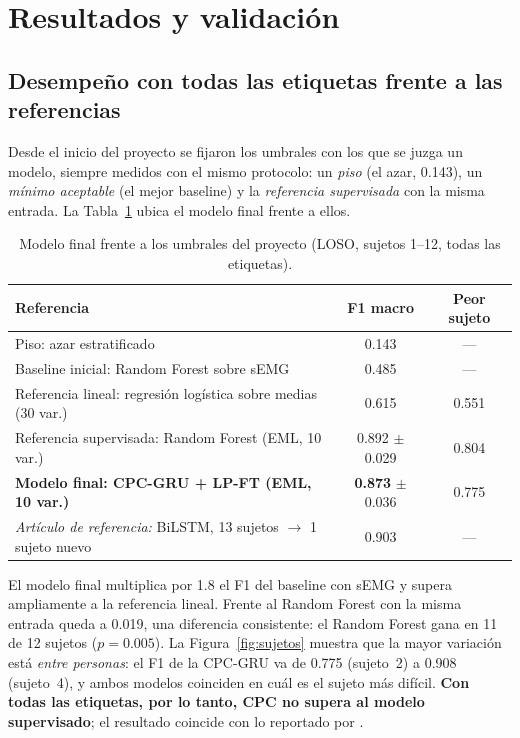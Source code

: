 \documentclass[letterpaper,11pt]{article}
\begin{document}
\section{Resultados y validación}

\subsection{Desempeño con todas las etiquetas frente a las referencias}
Desde el inicio del proyecto se fijaron los umbrales con los que se juzga un modelo, siempre medidos con el mismo protocolo: un \emph{piso} (el azar, 0.143), un \emph{mínimo aceptable} (el mejor baseline) y la \emph{referencia supervisada} con la misma entrada. La Tabla~\ref{tab:final} ubica el modelo final frente a ellos.

\begin{table}[H]
  \centering
  \small
  \caption{Modelo final frente a los umbrales del proyecto (LOSO, sujetos 1--12, todas las etiquetas).}
  \label{tab:final}
  \begin{tabular}{p{9.6cm}cc}
    \toprule
    Referencia & F1 macro & Peor sujeto \\
    \midrule
    Piso: azar estratificado                                  & 0.143 & --- \\
    Baseline inicial: Random Forest sobre sEMG                & 0.485 & --- \\
    Referencia lineal: regresión logística sobre medias (30 var.) & 0.615 & 0.551 \\
    Referencia supervisada: Random Forest (EML, 10 var.)      & 0.892 $\pm$ 0.029 & 0.804 \\
    \textbf{Modelo final: CPC-GRU + LP-FT (EML, 10 var.)}     & \textbf{0.873} $\pm$ 0.036 & 0.775 \\
    \midrule
    \emph{Artículo de referencia:} BiLSTM, 13 sujetos $\to$ 1 sujeto nuevo \parencite{bassani2025} & 0.903 & --- \\
    \bottomrule
  \end{tabular}
\end{table}

El modelo final multiplica por 1.8 el F1 del baseline con sEMG y supera ampliamente a la referencia lineal. Frente al Random Forest con la misma entrada queda a 0.019, una diferencia consistente: el Random Forest gana en 11 de 12 sujetos ($p = 0.005$). La Figura~\ref{fig:sujetos} muestra que la mayor variación está \emph{entre personas}: el F1 de la CPC-GRU va de 0.775 (sujeto~2) a 0.908 (sujeto~4), y ambos modelos coinciden en cuál es el sujeto más difícil. \textbf{Con todas las etiquetas, por lo tanto, CPC no supera al modelo supervisado}; el resultado coincide con lo reportado por \textcite{haresamudram2021}.
\end{document}
